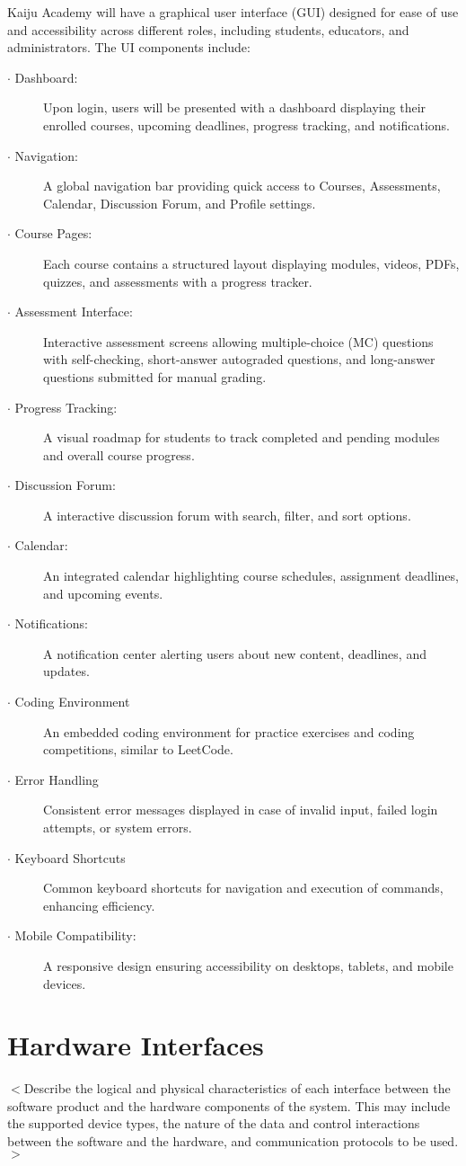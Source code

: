 \documentclass[a4paper, 11pt]{scrreprt}
\begin{document}
Kaiju Academy will have a graphical user interface (GUI) designed for ease of use and accessibility across different roles, including students, educators, and administrators. The UI components include:
\begin{description}
    \item[$\cdot$ Dashboard:] Upon login, users will be presented with a dashboard displaying their enrolled courses, upcoming deadlines, progress tracking, and notifications.
    \item[$\cdot$ Navigation:] A global navigation bar providing quick access to Courses, Assessments, Calendar, Discussion Forum, and Profile settings.
    \item[$\cdot$ Course Pages:] Each course contains a structured layout displaying modules, videos, PDFs, quizzes, and assessments with a progress tracker.
    \item[$\cdot$ Assessment Interface:] Interactive assessment screens allowing multiple-choice (MC) questions with self-checking, short-answer autograded questions, and long-answer questions submitted for manual grading.
    \item[$\cdot$ Progress Tracking:] A visual roadmap for students to track completed and pending modules and overall course progress.
    \item[$\cdot$ Discussion Forum:] A interactive discussion forum with search, filter, and sort options.
    \item[$\cdot$ Calendar:] An integrated calendar highlighting course schedules, assignment deadlines, and upcoming events.
    \item[$\cdot$ Notifications:] A notification center alerting users about new content, deadlines, and updates.
    \item[$\cdot$ Coding Environment] An embedded coding environment for practice exercises and coding competitions, similar to LeetCode.
    \item[$\cdot$ Error Handling] Consistent error messages displayed in case of invalid input, failed login attempts, or system errors.
    \item[$\cdot$ Keyboard Shortcuts] Common keyboard shortcuts for navigation and execution of commands, enhancing efficiency.
    \item[$\cdot$ Mobile Compatibility:] A responsive design ensuring accessibility on desktops, tablets, and mobile devices.
\end{description}

\section{Hardware Interfaces}
$<$Describe the logical and physical characteristics of each interface between 
the software product and the hardware components of the system. This may include 
the supported device types, the nature of the data and control interactions 
between the software and the hardware, and communication protocols to be 
used.$>$
\end{document}
